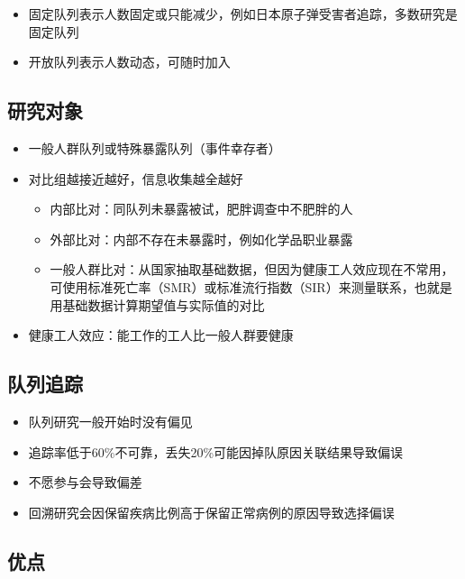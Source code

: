 \documentclass[
]{book}
\providecommand{\tightlist}{%
  \setlength{\itemsep}{0pt}\setlength{\parskip}{0pt}}
\begin{document}
\begin{itemize}
\tightlist
\item
  固定队列表示人数固定或只能减少，例如日本原子弹受害者追踪，多数研究是固定队列
\item
  开放队列表示人数动态，可随时加入
\end{itemize}

\hypertarget{ux7814ux7a76ux5bf9ux8c61-1}{%
\subsection{研究对象}\label{ux7814ux7a76ux5bf9ux8c61-1}}

\begin{itemize}
\tightlist
\item
  一般人群队列或特殊暴露队列（事件幸存者）
\item
  对比组越接近越好，信息收集越全越好

  \begin{itemize}
  \tightlist
  \item
    内部比对：同队列未暴露被试，肥胖调查中不肥胖的人
  \item
    外部比对：内部不存在未暴露时，例如化学品职业暴露
  \item
    一般人群比对：从国家抽取基础数据，但因为健康工人效应现在不常用，可使用标准死亡率（SMR）或标准流行指数（SIR）来测量联系，也就是用基础数据计算期望值与实际值的对比
  \end{itemize}
\item
  健康工人效应：能工作的工人比一般人群要健康
\end{itemize}

\hypertarget{ux961fux5217ux8ffdux8e2a}{%
\subsection{队列追踪}\label{ux961fux5217ux8ffdux8e2a}}

\begin{itemize}
\tightlist
\item
  队列研究一般开始时没有偏见
\item
  追踪率低于60\%不可靠，丢失20\%可能因掉队原因关联结果导致偏误
\item
  不愿参与会导致偏差
\item
  回溯研究会因保留疾病比例高于保留正常病例的原因导致选择偏误
\end{itemize}

\hypertarget{ux4f18ux70b9}{%
\subsection{优点}\label{ux4f18ux70b9}}
\end{document}
